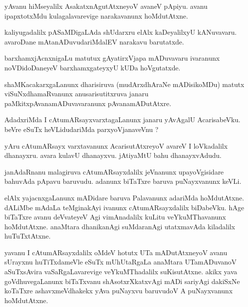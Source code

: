 \documentclass{article}
\begin{document}
\begin{mn}%
yAvanu hiMseyalilx AsakatxnAgutAtxneyoV avaneV pApiyu. avanu ipapxtotxMdu kulagalavarevige 
narakavanunx hoMdutAtxne.
\end{mn}

\begin{mn}%
kaliyugadalilx pASaMDigaLAda shUdarxru elAlx kaDeyalilxyU kANuvavaru. avaroDane mAtanADuvudariMdalEV 
narakavu barutatxde.
\end{mn}

\begin{mn}%
barxhamxjAcnxnigaLu matutux gAyatirxVjapa mADuvavaru ivaranunx noVDidoDaneyeV barxhamxgateyxyU kUDa 
hoVgutatxde.
\end{mn}

\begin{mn}%
shaMKacakarxgaLanunx dharisiruva (mudArxdhAraNe mADisikoMDu) matutx viSuNxdhamaRvanunx 
anusarisutitxruva janaru paMkitxpAvanamADuvavaranunx pAvanamADutAtxre.
\end{mn}

\begin{mn}%
AdadxriMda I cAtumARsayxvarxtagaLanunx janaru yAvAgalU AcarisabeVku. beVre eSuTx heVLidudariMda 
parxyoVjanaveVnu ?
\end{mn}

\begin{mn}%
yAru cAtumARsayx varxtavanunx AcarisutAtxreyoV avareV I loVkadalilx dhanayxru. avara kulavU 
dhanayxvu. jAtiyaMtU bahu dhanayxvAdudu.
\end{mn}

\begin{mn}%
janAdaRnanu malagiruva cAtumARsayxdalilx jeVnanunx upayoVgisidare bahuvAda pApavu baruvudu. adanunx 
biTaTxre baruva puNayxvanunx keVLi.
\end{mn}

\begin{mn}%
elAlx yajacnxgaLanunx mADidare baruva Palavanunx adariMda hoMdutAtxne. dALiMbe mAdaLa teMginakAyi 
ivanunx cAtumARsayxdalilx biDabeVku. hAge biTaTxre avanu deVvateyeV Agi vimAnadalilx kuLitu 
veYkuMThavanunx hoMdutAtxne. anaMtara dhanikanAgi suMdaranAgi utatxmavAda kiladalilx huTuTxtAtxne.
\end{mn}

\begin{mn}%
yavanu I cAtumARsayxdalilx oMdeV hotutx UTa mADutAtxneyoV avanu sUrayxnu huTiTxdameVle eSuTx 
mUhUtaRgaLa anaMtara UTamADuvanoV aSuTxsAvira vaSaRgaLavarevige veYkuMThadalilx suKisutAtxne. akikx 
yava goVdhuvegaLanunx biTaTxvanu shAsotxrXkatxvAgi mADi sariyAgi dakiSxNe koTaTxre ashavxmeVdhakekx 
yAva puNayxvu baruvudoV A puNayxvanunx hoMdutAtxne.
\end{mn}
\end{document}
